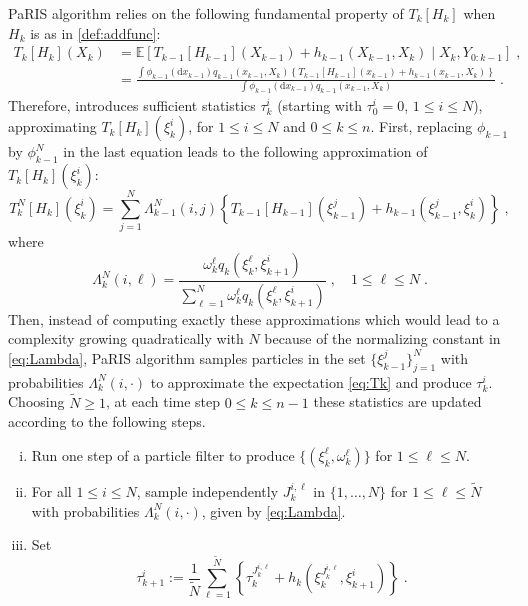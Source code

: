 \documentclass[12pt]{article}
\newcommand{\rmd}{\mathrm{d}}
\newcommand{\eqsp}{\;}
\newcommand{\1}{\mathrm{1}}
\newcommand{\qk}{q_{k}}
\begin{document}
PaRIS algorithm relies on the following fundamental property of $T_k[H_k]$ when $H_k$ is as in \eqref{def:addfunc}:
\begin{align*}
T_k[H_k](X_k) &=\mathbb{E}\left[T_{k-1}[H_{k-1}](X_{k-1}) + h_{k-1}(X_{k-1},X_k)\middle|X_k,Y_{0:k-1} \right]\eqsp,\\
&= \frac{\int \phi_{k-1}(\rmd x_{k-1})q_{k-1}(x_{k-1},X_k)\left\{T_{k-1}[H_{k-1}](x_{k-1}) + h_{k-1}(x_{k-1},X_k)\right\}}{\int \phi_{k-1}(\rmd x_{k-1})q_{k-1}(x_{k-1},X_k)}\eqsp.
\end{align*}
Therefore, \cite{olsson:westerborn:2016} introduces sufficient statistics $\tau^i_k$ (starting with $\tau^i_0 = 0$, $1\le i\le N$), approximating $T_k[H_k](\xi^i_k)$, for $1\le i\le N$ and $0\le k \le n$. First, replacing $\phi_{k-1}$ by $\phi^N_{k-1}$ in the last equation leads to the following approximation of $T_k[H_k](\xi^i_k)$:
\begin{equation}
\label{eq:Tk}
T_k^N[H_k](\xi_k^i) = \sum_{j=1}^N \Lambda_{k-1}^N(i,j)\left\{T_{k-1}[H_{k-1}](\xi_{k-1}^j) + h_{k-1}(\xi^j_{k-1},\xi^i_k)\right\}\eqsp, 
\end{equation}
where
\begin{equation}
\label{eq:Lambda}
\Lambda_{k}^N(i,\ell) = \frac{\omega^{\ell}_{k} \qk(\xi^{\ell}_{k},\xi_{k+1}^{i})}{\sum_{\ell=1}^N\omega^{\ell}_{k} \qk(\xi^{\ell}_{k},\xi_{k+1}^{i})}\eqsp,\quad 1\le \ell\le N\eqsp.
\end{equation}
Then, instead of computing exactly these approximations which would lead to a complexity growing quadratically with $N$ because of the normalizing constant in \eqref{eq:Lambda}, PaRIS algorithm samples particles in the set $\{\xi^j_{k-1}\}_{j=1}^N$ with probabilities $\Lambda_{k}^N(i,\cdot)$ to approximate the expectation \eqref{eq:Tk} and produce $\tau^i_k$.
Choosing $\tilde{N}\ge 1$, at each time step $0\le k \le {n-1}$ these statistics are updated according to the following steps.
\begin{enumerate}[(i)]
\item \label{it:PaRIS:filt} Run one step of a particle filter to produce $\{(\xi^{\ell}_k, \omega^{\ell}_k)\}$ for $1\le \ell \le N$.
\item \label{it:PaRIS:sampleindex} For all $1\le i \le N$, sample independently $J_{k}^{i,\ell}$ in $\{1,\ldots,N\}$ for $1\le \ell \le \widetilde N$ with probabilities $\Lambda_{k}^N(i,\cdot)$, given by \eqref{eq:Lambda}.
\item \label{it:PaRIS:smooth} Set
\[
\tau^{i}_{k+1} := \frac{1}{\widetilde{N}} \sum^{\widetilde{N}}_{\ell=1} \left\{ \tau^{J_{k}^{i,\ell}}_{k} + h_{k} \left(\xi^{J_{k}^{i,\ell}}_{k}, \xi^{i}_{k+1}\right)  \right\}\eqsp.
\]
\end{enumerate}
\end{document}
